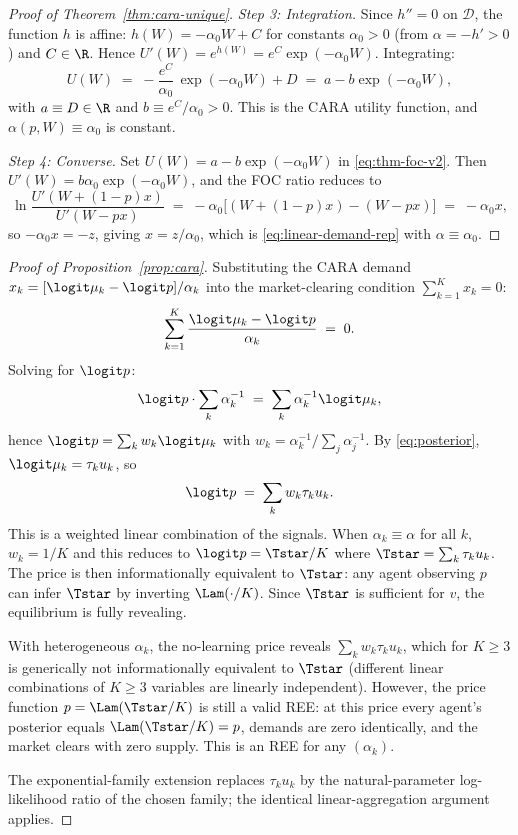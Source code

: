 \begin{proof}[Proof of Theorem~\ref{thm:cara-unique}]
\emph{Step 3: Integration.} Since $h''=0$ on $\mathcal{D}$, the function
$h$ is affine: $h(W)=-\alpha_{0}W+C$ for constants $\alpha_{0}>0$ (from
$\alpha=-h'>0$) and $C\in\R$.
Hence $U'(W)=e^{h(W)}=e^{C}\exp(-\alpha_{0}W)$. Integrating:
\[
   U(W) \;=\; -\frac{e^{C}}{\alpha_{0}}\,\exp(-\alpha_{0}W) + D
   \;=\; a - b\exp(-\alpha_{0}W),
\]
with $a\equiv D\in\R$ and $b\equiv e^{C}/\alpha_{0}>0$. This is the CARA
utility function, and $\alpha(p,W)\equiv\alpha_{0}$ is constant.

\emph{Step 4: Converse.} Set $U(W)=a-b\exp(-\alpha_{0}W)$ in
\eqref{eq:thm-foc-v2}. Then
$U'(W)=b\alpha_{0}\exp(-\alpha_{0}W)$, and the FOC ratio reduces to
\[
   \ln\frac{U'(W+(1-p)x)}{U'(W-px)}
   \;=\; -\alpha_{0}\bigl[(W+(1-p)x)-(W-px)\bigr]
   \;=\; -\alpha_{0}x,
\]
so $-\alpha_{0}x = -z$, giving $x=z/\alpha_{0}$, which is
\eqref{eq:linear-demand-rep} with $\alpha\equiv\alpha_{0}$.
\end{proof}

\begin{proof}[Proof of Proposition~\ref{prop:cara}]
Substituting the CARA demand $x_{k}=[\logit\mu_{k}-\logit p]/\alpha_{k}$
into the market-clearing condition $\sum_{k=1}^{K}x_{k}=0$:
\[
   \sum_{k=1}^{K} \frac{\logit\mu_{k}-\logit p}{\alpha_{k}} \;=\; 0.
\]
Solving for $\logit p$:
\[
   \logit p \cdot \sum_{k}\alpha_{k}^{-1}
   \;=\; \sum_{k}\alpha_{k}^{-1}\logit\mu_{k},
\]
hence $\logit p=\sum_{k}w_{k}\logit\mu_{k}$ with
$w_{k}=\alpha_{k}^{-1}/\sum_{j}\alpha_{j}^{-1}$.
By \eqref{eq:posterior}, $\logit\mu_{k}=\tau_{k}u_{k}$, so
\[
   \logit p \;=\; \sum_{k}w_{k}\tau_{k}u_{k}.
\]
This is a weighted linear combination of the signals. When
$\alpha_{k}\equiv\alpha$ for all $k$, $w_{k}=1/K$ and this reduces to
$\logit p = \Tstar/K$ where $\Tstar=\sum_{k}\tau_{k}u_{k}$. The price is
then informationally equivalent to $\Tstar$: any agent observing $p$
can infer $\Tstar$ by inverting $\Lam(\cdot/K)$. Since $\Tstar$ is
sufficient for $v$, the equilibrium is fully revealing.

With heterogeneous $\alpha_{k}$, the no-learning price reveals
$\sum_{k}w_{k}\tau_{k}u_{k}$, which for $K\geq 3$ is generically not
informationally equivalent to $\Tstar$ (different linear combinations
of $K\geq 3$ variables are linearly independent). However, the price
function $p=\Lam(\Tstar/K)$ is still a valid REE: at this price every
agent's posterior equals $\Lam(\Tstar/K)=p$, demands are zero
identically, and the market clears with zero supply. This is an REE
for any $(\alpha_{k})$.

The exponential-family extension replaces $\tau_{k}u_{k}$ by the
natural-parameter log-likelihood ratio of the chosen family; the
identical linear-aggregation argument applies.
\end{proof}

